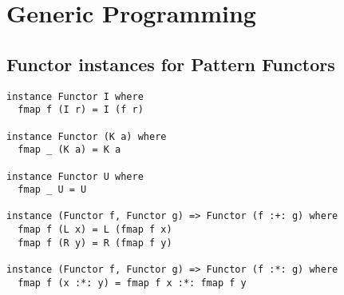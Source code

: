 \appendix
\chapter{Generic Programming}
\section{Functor instances for Pattern Functors}
\label{app-inst-functor-patfun}
\begin{verbatim}
instance Functor I where
  fmap f (I r) = I (f r)

instance Functor (K a) where
  fmap _ (K a) = K a

instance Functor U where
  fmap _ U = U

instance (Functor f, Functor g) => Functor (f :+: g) where
  fmap f (L x) = L (fmap f x)
  fmap f (R y) = R (fmap f y)

instance (Functor f, Functor g) => Functor (f :*: g) where
  fmap f (x :*: y) = fmap f x :*: fmap f y
\end{verbatim}
